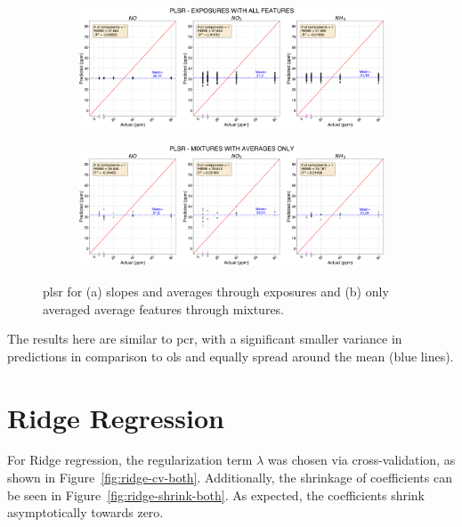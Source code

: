\begin{figure}[!htb]
	\centering
	
	\begin{subfigure}[t]{1\textwidth}
		\includegraphics[width=1\linewidth]{../figures/plsr-act-vs-pred.png}
		\caption{}
		\label{fig:pls-act-vs-pred} 
	\end{subfigure}
	
	\begin{subfigure}[t]{1\textwidth}
		\includegraphics[width=1\linewidth]{../figures/plsr-act-vs-pred-avg-feat.png}
		\caption{}
		\label{fig:pls-act-vs-pred-avg-feat}
	\end{subfigure}
	
	\caption{\acrshort{plsr} for (a) slopes and averages through exposures and (b) only averaged average features through mixtures.}
	\label{fig:plsr-actual-vs-pred-both}
\end{figure}

The results here are similar to \acrshort{pcr}, with a significant smaller variance in predictions in comparison to \acrshort{ols} and equally spread around the mean (blue lines).

\clearpage
\section{Ridge Regression}
\label{sec:results-ridge}

For Ridge regression, the regularization term $\lambda$ was chosen via cross-validation, as shown in Figure~\ref{fig:ridge-cv-both}. Additionally, the shrinkage of coefficients can be seen in Figure~\ref{fig:ridge-shrink-both}. As expected, the coefficients shrink asymptotically towards zero.


